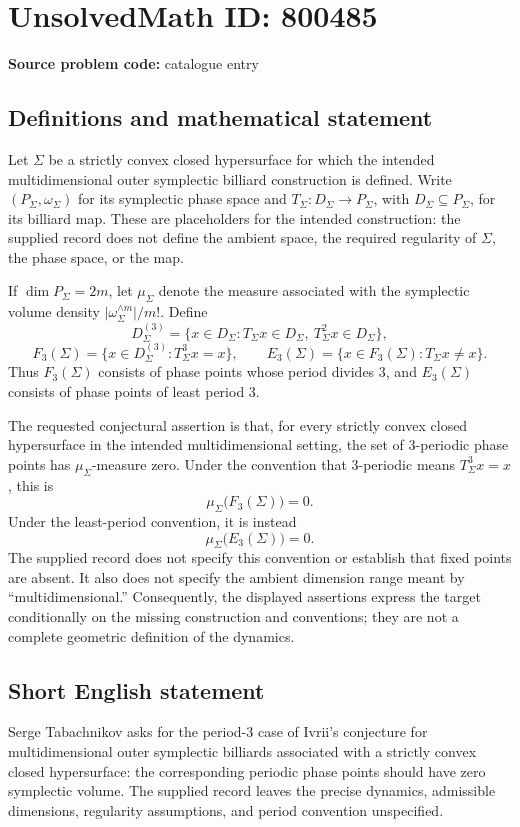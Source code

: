 \documentclass[11pt]{article}
\begin{document}
\section*{UnsolvedMath ID: 800485}
\textbf{Source problem code:} catalogue entry
\subsection{Definitions and mathematical statement}
Let \(\Sigma\) be a strictly convex closed hypersurface for which the intended multidimensional outer symplectic billiard construction is defined. Write \((P_\Sigma,\omega_\Sigma)\) for its symplectic phase space and \(T_\Sigma:D_\Sigma\to P_\Sigma\), with \(D_\Sigma\subseteq P_\Sigma\), for its billiard map. These are placeholders for the intended construction: the supplied record does not define the ambient space, the required regularity of \(\Sigma\), the phase space, or the map.

If \(\dim P_\Sigma=2m\), let \(\mu_\Sigma\) denote the measure associated with the symplectic volume density \(\lvert\omega_\Sigma^{\wedge m}\rvert/m!\). Define
\[
D_\Sigma^{(3)}=\{x\in D_\Sigma:T_\Sigma x\in D_\Sigma,\ T_\Sigma^2x\in D_\Sigma\},
\]
\[
F_3(\Sigma)=\{x\in D_\Sigma^{(3)}:T_\Sigma^3x=x\},\qquad
E_3(\Sigma)=\{x\in F_3(\Sigma):T_\Sigma x\ne x\}.
\]
Thus \(F_3(\Sigma)\) consists of phase points whose period divides \(3\), and \(E_3(\Sigma)\) consists of phase points of least period \(3\).

The requested conjectural assertion is that, for every strictly convex closed hypersurface in the intended multidimensional setting, the set of \(3\)-periodic phase points has \(\mu_\Sigma\)-measure zero. Under the convention that \(3\)-periodic means \(T_\Sigma^3x=x\), this is
\[
\mu_\Sigma\bigl(F_3(\Sigma)\bigr)=0.
\]
Under the least-period convention, it is instead
\[
\mu_\Sigma\bigl(E_3(\Sigma)\bigr)=0.
\]
The supplied record does not specify this convention or establish that fixed points are absent. It also does not specify the ambient dimension range meant by ``multidimensional.'' Consequently, the displayed assertions express the target conditionally on the missing construction and conventions; they are not a complete geometric definition of the dynamics.
\subsection{Short English statement}
Serge Tabachnikov asks for the period-\(3\) case of Ivrii's conjecture for multidimensional outer symplectic billiards associated with a strictly convex closed hypersurface: the corresponding periodic phase points should have zero symplectic volume. The supplied record leaves the precise dynamics, admissible dimensions, regularity assumptions, and period convention unspecified.
\end{document}
